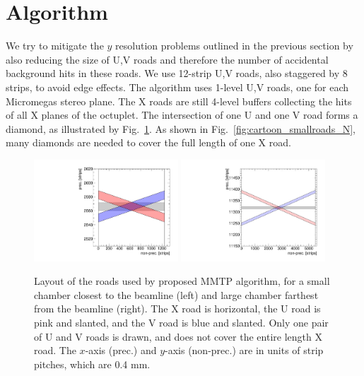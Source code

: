 \section{Algorithm}
\label{sec:stereoroads}
We try to mitigate the $y$ resolution problems outlined in the previous section by also reducing the size of U,V roads and
 therefore the number of
accidental background hits in these roads. We use 12-strip U,V roads, also staggered by 8 strips, to avoid edge effects.
The algorithm uses 1-level U,V roads, one for each Micromegas stereo plane.
The X roads are still  4-level buffers collecting the hits of all X planes of the octuplet.
 The intersection of one U and one V road forms a  diamond, as
 illustrated by Fig.~\ref{fig:cartoon_smallroads_1}. 
 As shown in Fig.~\ref{fig:cartoon_smallroads_N}, many diamonds are needed to cover the full length of one X road.
\begin{figure}[!htpb]
  \begin{center}
    \includegraphics[width=0.48\textwidth]{figures/cartoon_roads_small_smallstereo_1.pdf}
    \includegraphics[width=0.48\textwidth]{figures/cartoon_roads_large_smallstereo_1.pdf}
  \end{center}
  \vspace{-10pt}
  \caption{Layout of the roads used by proposed MMTP algorithm, for a small chamber closest to the beamline (left)
 and large chamber farthest from the beamline (right). The X road is horizontal, the U road is pink and slanted,
 and the V road is blue and slanted. Only one pair of U and V roads is drawn, and  does not cover the entire length X road.
 The  $x$-axis (prec.) and $y$-axis (non-prec.) are in units of strip pitches, which are 0.4 mm.}
  \label{fig:cartoon_smallroads_1}
\end{figure}
